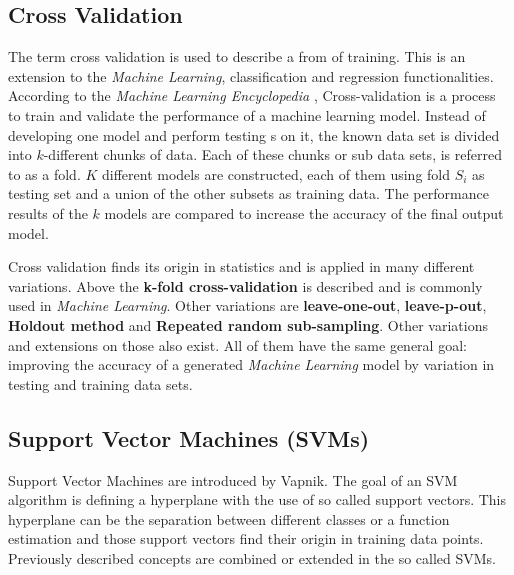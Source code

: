 \subsection{Cross Validation}
The term cross validation is used to describe a from of training.
This is an extension to the \textit{Machine Learning}, classification and regression functionalities.
According to the \textit{Machine Learning Encyclopedia} \cite{MachLearnEncy2017Spring}, Cross-validation is a process to train and validate the performance of a machine learning model.
Instead of developing one model and perform testing s on it, the known data set is divided into $k$-different chunks of data.
Each of these chunks or sub data sets, is referred to as a fold. 
$K$ different models are constructed, each of them using fold $S_i$ as testing set and a union of the other subsets as training data.
The performance results of the $k$ models are compared to increase the accuracy of the final output model.
\par 
Cross validation finds its origin in statistics and is applied in many different variations. 
Above the \textbf{k-fold cross-validation} is described and is commonly used in \textit{Machine Learning}.
Other variations are \textbf{leave-one-out}, \textbf{leave-p-out}, \textbf{Holdout method} and \textbf{Repeated random sub-sampling}.
Other variations and extensions on those also exist.
All of them have the same general goal: improving the accuracy of a generated \textit{Machine Learning} model by variation in testing and training data sets. 

\subsection{Support Vector Machines (SVMs)}
Support Vector Machines are introduced by Vapnik. 
The goal of an SVM algorithm is defining a hyperplane with the use of so called support vectors.
This hyperplane can be the separation between different classes or a function estimation and those support vectors find their origin in training data points. 
Previously described concepts are combined or extended in the so called SVMs.


